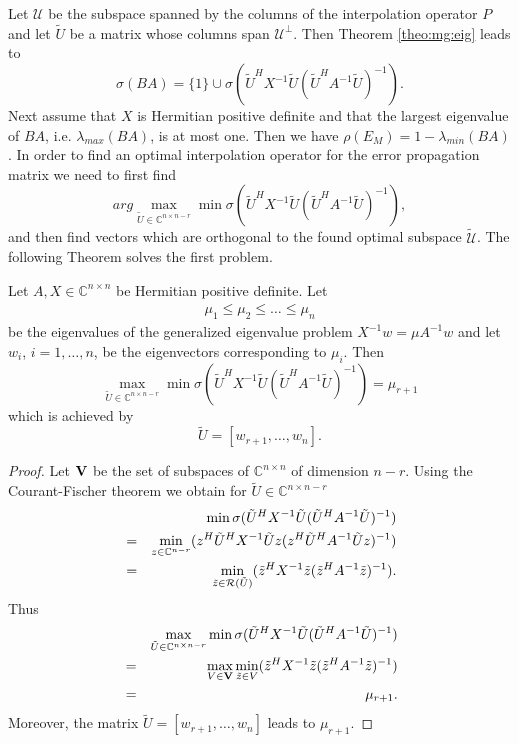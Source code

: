 \documentclass[final]{siamltex}
\newcommand{\innCnn}{\in\mathbb{C}^{n\times n}}
\newcommand{\innbCnnmr}{\in\mathbb{C}^{n\times n-r}}
\newcommand{\innCnmr}{\in\mathbb{C}^{n-r}}
\newcommand{\U}{\mathcal{U}}
\newcommand{\beqo}{\begin{eqnarray*}}
\newcommand{\beq}{\begin{eqnarray}}
\newcommand{\eeqo}{\end{eqnarray*}}
\newcommand{\eeq}{\end{eqnarray}}
\numberwithin{equation}{section}
\newcommand{\ran} {{\cal R}}
\newcommand{\Cnn}{\mathbb{C}^{n \times n}}
\begin{document}

Let $\U $ be the subspace spanned  by the columns of the interpolation operator
$P$ and let $\tilde U$ be a matrix whose  columns span  $\U ^\perp$. Then
Theorem \ref{theo:mg:eig}  leads to
\[
\sigma (BA) = \{1\} \cup \sigma(\tilde U^HX^{-1}\tilde U (\tilde
U^HA^{-1}\tilde U)^{-1}).
\]
Next assume that $X$ is Hermitian positive definite and that the largest
eigenvalue of $BA$, i.e. $\lambda_{max}(BA)$,  is at most one. Then we have
$\rho(E_M) = 1 - \lambda_{min}(BA)$. In order to find an optimal interpolation
operator for the error propagation matrix  we need  to first find
\[
arg \max_{\tilde U \innbCnnmr} \min \sigma(\tilde U^HX^{-1}\tilde U (\tilde
U^HA^{-1}\tilde U)^{-1}),
\]
and then find vectors which are orthogonal to the found optimal subspace
$\mathcal{\tilde U}$.
The following Theorem  solves the   first  problem.

\begin{theorem} \label{theo:main}
Let $A, X \innCnn$ be Hermitian positive definite. Let 
\beq
\mu_1 \leq \mu_2 \leq \ldots \leq  \mu_n 
\eeq
be the  eigenvalues of the generalized eigenvalue problem $X^{-1}w = \mu
A^{-1}w$ and let $w_i$, $i = 1, \ldots, n$, be the eigenvectors corresponding
to $\mu_i$. Then
\[
\max_{\tilde U \innbCnnmr} \min \sigma(\tilde U^HX^{-1}\tilde U (\tilde
U^HA^{-1}\tilde U)^{-1}) = \mu_{r+1}
\]
which is achieved by 
\[
\tilde U = [w_{r+1}, \ldots, w_n].
\] 
\end{theorem}
\begin{proof}
Let ${\bf V}$ be the set of subspaces of $\Cnn$ of dimension $n-r$. Using the
Courant-Fischer theorem we obtain for $\tilde U \innbCnnmr$
\beqo
& &  \min \sigma(\tilde U^HX^{-1}\tilde U (\tilde U^HA^{-1}\tilde U)^{-1})\\
& = &  \min_{z \innCnmr} (z^H\tilde U^HX^{-1}\tilde Uz (z^H\tilde
U^HA^{-1}\tilde Uz)^{-1})\\
& = &  \min_{\tilde z \in {\ran (\tilde U)} } (\tilde z^HX^{-1}\tilde z (\tilde
z^HA^{-1}\tilde z)^{-1}).
\eeqo
Thus
\beqo
& &  \max_{\tilde U \innbCnnmr} \min \sigma(\tilde U^HX^{-1}\tilde U (\tilde
U^HA^{-1}\tilde U)^{-1})\\
& = & \max_{V  \in {\bf V}} \min_{\tilde z \in V} (\tilde z^HX^{-1}\tilde z
(\tilde z^HA^{-1}\tilde z)^{-1})\\
&  = & \mu_{r+1}.
\eeqo
Moreover, the matrix $\tilde U = [w_{r+1}, \ldots, w_n]$ leads  to $\mu_{r+1}$.
\end{proof}
\end{document}
